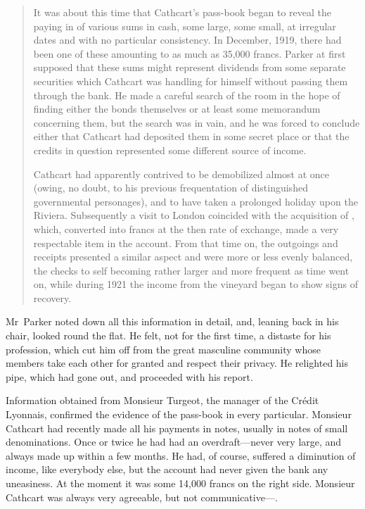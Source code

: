 \begin{quotation}
It was about this time that Cathcart's pass-book began to reveal the paying in of various sums in cash, some large, some small, at irregular dates and with no particular consistency. In December, 1919, there had been one of these amounting to as much as 35,000 francs.  Parker at first supposed that these sums might represent dividends from some separate securities which Cathcart was handling for himself without passing them through the bank. He made a careful search of the room in the hope of finding either the bonds themselves or at least some memorandum concerning them, but the search was in vain, and he was forced to conclude either that Cathcart had deposited them in some secret place or that the credits in question represented some different source of income.

Cathcart had apparently contrived to be demobilized almost at once (owing, no doubt, to his previous frequentation of distinguished governmental personages), and to have taken a prolonged holiday upon the Riviera. Subsequently a visit to London coincided with the acquisition of , which, converted into francs at the then rate of exchange, made a very respectable item in the account. From that time on, the outgoings and receipts presented a similar aspect and were more or less evenly balanced, the checks to self becoming rather larger and more frequent as time went on, while during 1921 the income from the vineyard began to show signs of recovery.

\end{quotation}

Mr~Parker noted down all this information in detail, and, leaning back in his chair, looked round the flat. He felt, not for the first time, a distaste for his profession, which cut him off from the great masculine community whose members take each other for granted and respect their privacy. He relighted his pipe, which had gone out, and proceeded with his report.

Information obtained from Monsieur Turgeot, the manager of the Crédit Lyonnais, confirmed the evidence of the pass-book in every particular.  Monsieur Cathcart had recently made all his payments in notes, usually in notes of small denominations. Once or twice he had had an overdraft—never very large, and always made up within a few months. He had, of course, suffered a diminution of income, like everybody else, but the account had never given the bank any uneasiness. At the moment it was some 14,000 francs on the right side. Monsieur Cathcart was always very agreeable, but not communicative—.


